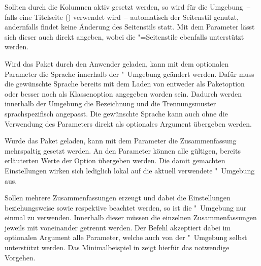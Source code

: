 \begin{DeclareEntity*}{}
\begin{DeclareEntity*}{}
\begin{DeclareEntity*}{}
\begin{Declaration}
\begin{Declaration}
\begin{Declaration}
\begin{Declaration}
\begin{Declaration}
\begin{Declaration}
\begin{Declaration}
Sollten durch  die Kolumnen aktiv gesetzt werden,
so wird für die Umgebung~-- falls eine Titelseite () 
verwendet wird~-- automatisch der Seitenstil  genutzt, 
andernfalls findet keine Änderung des Seitenstils statt. Mit dem Parameter 
 lässt sich dieser auch direkt angeben, wobei 
die "=Seitenstile ebenfalls unterstützt werden.

%
Wird das Paket  durch den Anwender geladen, kann mit dem 
optionalen Parameter  die Sprache 
innerhalb der "~Umgebung geändert werden. Dafür muss die 
gewünschte Sprache bereits mit dem Laden von  entweder als 
Paketoption oder besser noch als Klassenoption angegeben worden sein. Dadurch 
werden innerhalb der Umgebung die Bezeichnung  und die 
Trennungsmuster sprachspezifisch angepasst. Die gewünschte Sprache kann auch 
ohne die Verwendung des Parameters  direkt als 
optionales Argument übergeben werden.

%
Wurde das Paket  geladen, kann mit dem Parameter 
 die Zusammenfassung mehrspaltig 
gesetzt werden. An den Parameter  können alle 
gültigen, bereits erläuterten Werte der Option  übergeben 
werden. Die damit gemachten Einstellungen wirken sich lediglich lokal auf die 
aktuell verwendete "~Umgebung aus.

%
Sollen mehrere Zusammenfassungen erzeugt und dabei die Einstellungen 
 beziehungsweise  sowie 
 respektive  beachtet werden, so 
ist die "~Umgebung nur einmal zu verwenden. Innerhalb 
dieser müssen die einzelnen Zusammenfassungen jeweils mit  
voneinander getrennt werden. Der Befehl akzeptiert dabei im optionalen Argument 
alle Parameter, welche auch von der "~Umgebung selbst 
unterstützt werden. Das Minimalbeispiel in  
zeigt hierfür das notwendige Vorgehen.
\end{Declaration}
\end{Declaration}
\end{Declaration}
\end{Declaration}
\end{Declaration}
\end{Declaration}
\end{Declaration}


\end{DeclareEntity*}
\end{DeclareEntity*}
\end{DeclareEntity*}
